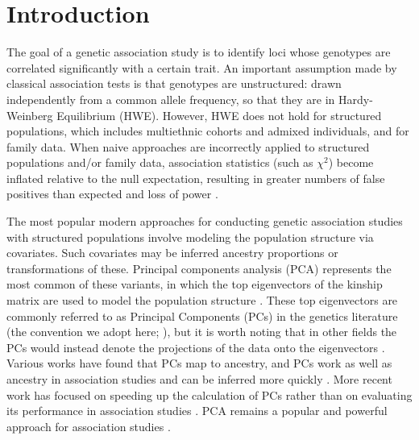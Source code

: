 \documentclass[11pt]{article}
\begin{document}
\clearpage

\tableofcontents

\clearpage
	
\section{Introduction} 

The goal of a genetic association study is to identify loci whose genotypes are correlated significantly with a certain trait.
An important assumption made by classical association tests is that genotypes are unstructured: drawn independently from a common allele frequency, so that they are in Hardy-Weinberg Equilibrium (HWE).
However, HWE does not hold for structured populations, which includes multiethnic cohorts and admixed individuals, and for family data.
When naive approaches are incorrectly applied to structured populations and/or family data, association statistics (such as $\chi^2$) become inflated relative to the null expectation, resulting in greater numbers of false positives than expected and loss of power \citep{devlin_genomic_1999, voight_confounding_2005, astle_population_2009}.

The most popular modern approaches for conducting genetic association studies with structured populations involve modeling the population structure via covariates.
Such covariates may be inferred ancestry proportions \citep{pritchard_association_2000} or transformations of these.
Principal components analysis (PCA) represents the most common of these variants, in which the top eigenvectors of the kinship matrix are used to model the population structure \citep{zhang_semiparametric_2003, price_principal_2006, bouaziz_accounting_2011}.
These top eigenvectors are commonly referred to as Principal Components (PCs) in the genetics literature (the convention we adopt here; \cite{patterson_population_2006}), but it is worth noting that in other fields the PCs would instead denote the projections of the data onto the eigenvectors \citep{jolliffe_principal_2002}.
Various works have found that PCs map to ancestry, and PCs work as well as ancestry in association studies and can be inferred more quickly \citep{patterson_population_2006, zhao_arabidopsis_2007, bouaziz_accounting_2011}.
More recent work has focused on speeding up the calculation of PCs rather than on evaluating its performance in association studies \citep{lee_sparse_2012, abraham_fast_2014, galinsky_fast_2016, abraham_flashpca2:_2017}.
PCA remains a popular and powerful approach for association studies \citep{wojcik_genetic_2019}.
\end{document}
